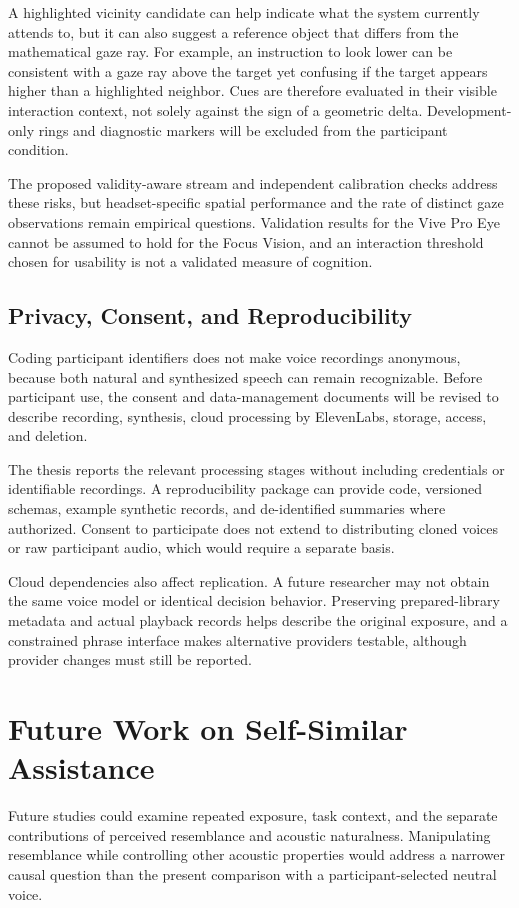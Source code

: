 A highlighted vicinity candidate can help indicate what the system currently attends to, but it can also suggest a reference object that differs from the mathematical gaze ray. For example, an instruction to look lower can be consistent with a gaze ray above the target yet confusing if the target appears higher than a highlighted neighbor. Cues are therefore evaluated in their visible interaction context, not solely against the sign of a geometric delta. Development-only rings and diagnostic markers will be excluded from the participant condition.

The proposed validity-aware stream and independent calibration checks address these risks, but headset-specific spatial performance and the rate of distinct gaze observations remain empirical questions. Validation results for the Vive Pro Eye cannot be assumed to hold for the Focus Vision, and an interaction threshold chosen for usability is not a validated measure of cognition.

\subsection{Privacy, Consent, and Reproducibility}
Coding participant identifiers does not make voice recordings anonymous, because both natural and synthesized speech can remain recognizable. Before participant use, the consent and data-management documents will be revised to describe recording, synthesis, cloud processing by ElevenLabs, storage, access, and deletion.

The thesis reports the relevant processing stages without including credentials or identifiable recordings. A reproducibility package can provide code, versioned schemas, example synthetic records, and de-identified summaries where authorized. Consent to participate does not extend to distributing cloned voices or raw participant audio, which would require a separate basis.

Cloud dependencies also affect replication. A future researcher may not obtain the same voice model or identical decision behavior. Preserving prepared-library metadata and actual playback records helps describe the original exposure, and a constrained phrase interface makes alternative providers testable, although provider changes must still be reported.

\section{Future Work on Self-Similar Assistance}
Future studies could examine repeated exposure, task context, and the separate contributions of perceived resemblance and acoustic naturalness. Manipulating resemblance while controlling other acoustic properties would address a narrower causal question than the present comparison with a participant-selected neutral voice.

